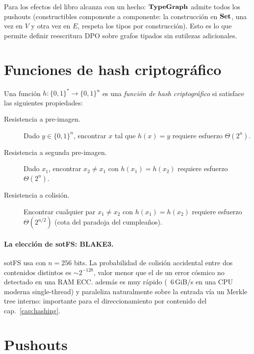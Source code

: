 \begin{observacion}
\label{obs:tgraph-cocompleta}
Para los efectos del libro alcanza con un hecho: $\mathbf{TypeGraph}$ admite
todos los pushouts (constructibles componente a componente: la
construcción en $\mathbf{Set}$, una vez en $V$ y otra vez en $E$, respeta los
tipos por construcción). Esto es lo que permite definir reescritura DPO
sobre grafos tipados sin sutilezas adicionales.
\end{observacion}

\section{Funciones de hash criptográfico}

\begin{defn}
\label{def:hash}
Una función $h: \{0,1\}^* \to \{0,1\}^n$ es una \emph{función de hash
criptográfico} si satisface las siguientes propiedades:
\begin{description}
  \item[Resistencia a pre-imagen.] Dado $y \in \{0,1\}^n$, encontrar
    $x$ tal que $h(x) = y$ requiere esfuerzo $\Theta(2^n)$.
  \item[Resistencia a segunda pre-imagen.] Dado $x_1$, encontrar
    $x_2 \neq x_1$ con $h(x_1) = h(x_2)$ requiere esfuerzo
    $\Theta(2^n)$.
  \item[Resistencia a colisión.] Encontrar cualquier par $x_1 \neq
    x_2$ con $h(x_1) = h(x_2)$ requiere esfuerzo $\Theta(2^{n/2})$
    (cota del paradoja del cumpleaños).
\end{description}
\end{defn}

\paragraph{La elección de sotFS: BLAKE3.} sotFS usa \blake{}
\cite{BLAKE3} con $n = 256$ bits. La probabilidad de colisión accidental
entre dos contenidos distintos es $\sim 2^{-128}$, valor menor que el
de un error cósmico no detectado en una RAM ECC. \blake{} además es
muy rápido (~6\,GiB/s en una CPU moderna single-thread) y paraleliza
naturalmente sobre la entrada vía un Merkle tree interno: importante
para el direccionamiento por contenido del cap.~\ref{cap:hashing}.

\section{Pushouts}

